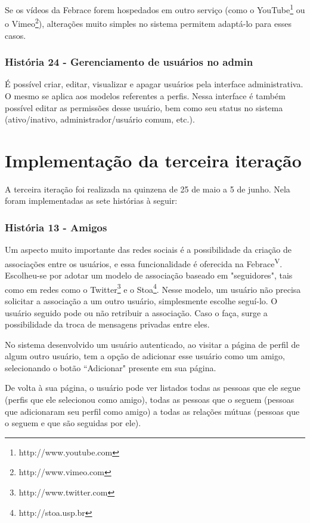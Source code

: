 \documentclass[a4paper,12pt,font=plain,header=plain]{abnt}
\begin{document}
      Se os vídeos da Febrace forem hospedados em outro serviço (como o YouTube\footnote{http://www.youtube.com} ou o Vimeo\footnote{http://www.vimeo.com}), alterações muito simples no sistema permitem adaptá-lo para esses casos.

    \subsubsection{História 24 - Gerenciamento de usuários no admin}
      É possível criar, editar, visualizar e apagar usuários pela interface administrativa. O mesmo se aplica aos modelos referentes a perfis. Nessa interface é também possível editar as permissões desse usuário, bem como seu status no sistema (ativo/inativo, administrador/usuário comum, etc.).

  \section{Implementação da terceira iteração}
    A terceira iteração foi realizada na quinzena de 25 de maio a 5 de junho. Nela foram implementadas as sete histórias à seguir:

    \subsubsection{História 13 - Amigos}
      Um aspecto muito importante das redes sociais é a possibilidade da criação de associações entre os usuários, e essa funcionalidade é oferecida na Febrace\textsuperscript{V}. Escolheu-se por adotar um modelo de associação baseado em "seguidores", tais como em redes como o Twitter\footnote{http://www.twitter.com} e o Stoa\footnote{http://stoa.usp.br}. Nesse modelo, um usuário não precisa solicitar a associação a um outro usuário, simplesmente escolhe seguí-lo. O usuário seguido pode ou não retribuir a associação. Caso o faça, surge a possibilidade da troca de mensagens privadas entre eles.

      No sistema desenvolvido um usuário autenticado, ao visitar a página de perfil de algum outro usuário, tem a opção de adicionar esse usuário como um amigo, selecionando o botão “Adicionar" presente em sua página.

      De volta à sua página, o usuário pode ver listados todas as pessoas que ele segue (perfis que ele selecionou como amigo), todas as pessoas que o seguem (pessoas que adicionaram seu perfil como amigo) a todas as relações mútuas (pessoas que o seguem e que são seguidas por ele).
\end{document}
